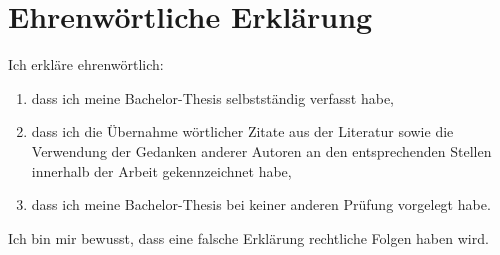 \documentclass[
	12pt, %
	a4paper,
	listof=totoc, %
	bibliography=totoc, %
	numbers=noenddot, %
	ngerman, %
	headsepline, %
	oneside %
	]{scrbook} %
\begin{document}
{%


%







\chapter*{Ehrenwörtliche Erklärung}

\thispagestyle{empty}

Ich erkläre ehrenwörtlich:
\begin{enumerate}
	\item dass ich meine Bachelor-Thesis selbstständig verfasst habe,
	\item dass ich die Übernahme wörtlicher Zitate aus der Literatur sowie die Verwendung der Gedanken anderer Autoren an den entsprechenden Stellen innerhalb der Arbeit gekennzeichnet habe,
	\item dass ich meine Bachelor-Thesis bei keiner anderen Prüfung vorgelegt habe.
\end{enumerate}
Ich bin mir bewusst, dass eine falsche Erklärung rechtliche Folgen haben wird.
\vspace{2cm}

}
\end{document}
